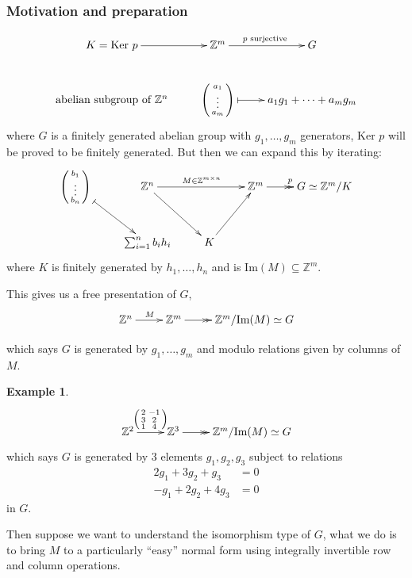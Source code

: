 \documentclass[a4paper]{article}
\newcommand{\Ker}{\text{Ker }}
\theoremstyle{definition}
\newtheorem{example}[defn]{Example}
\begin{document}
\subsubsection{Motivation and preparation}
\[
\xymatrix{
K=\Ker p \ar[r] & \mathbb Z^m\ar[r]^{p\text{ surjective} } & G \\
{\text{abelian subgroup of }\mathbb Z^n} & {\begin{psmallmatrix}
     a_1 \\ \vdots \\ a_m
 \end{psmallmatrix}}\ar@{|-{>}}[r]& a_1 g_1 +\cdots+a_m g_m
}
\]
where $G$ is a finitely generated abelian group with $g_1,\ldots,g_m$ generators, $\Ker p$ will be proved to be finitely generated. But then we can expand this by iterating:
\[
\xymatrix{
{\begin{psmallmatrix}
     b_1 \\ \vdots \\ b_n
 \end{psmallmatrix}} \ar@{|-{>}}[dr] & \mathbb Z^n \ar[dr] \ar[rr]^{ M \in \mathbb Z^{m\times n}} & & \mathbb Z^m \ar@{-{>>}}[r]^p & G \simeq \mathbb Z^m / K \\
& {\sum_{i=1}^n b_i h_i} & K \ar[ur]
}
\]
where $K$ is finitely generated by $h_1,\ldots,h_n$ and is $\text{Im}(M) \subseteq \mathbb Z^m$.

This gives us a free presentation of $G$, 
\[
\xymatrix{
\mathbb Z^n \ar[r]^{M} & \mathbb Z^m\ar@{-{>>}}[r] & {\mathbb Z^m / \text{Im}( M)} \simeq G
}
\]

which says $G$ is generated by $g_1,\ldots,g_m$ and modulo relations given by columns of $M$.
\begin{example}
\[
\xymatrix{
\mathbb Z^2 \ar[r]^{\begin{psmallmatrix}
    2 & -1 \\ 3 & 2 \\ 1 & 4
\end{psmallmatrix}} & \mathbb Z^3 \ar@{-{>>}}[r] & \mathbb Z^m/\text{Im}( M) \simeq G
}
\]
which says $G$ is generated by 3 elements $g_1,g_2,g_3$ subject to relations
\[
\begin{aligned}
2g_1+3g_2+g_3 &= 0 \\
-g_1+2g_2+4g_3 &= 0
\end{aligned}
\]
in $G$.
\end{example}
Then suppose we want to understand the isomorphism type of $G$, what we do is to bring $ M$ to a particularly ``easy'' normal form using integrally invertible row and column operations.
\end{document}
